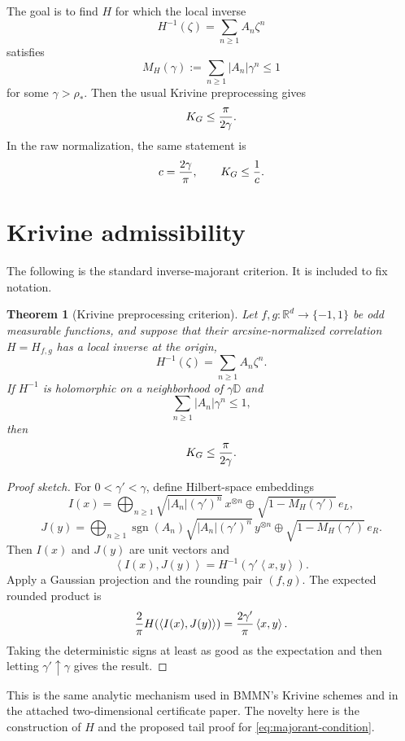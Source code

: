\documentclass[11pt]{article}
\newtheorem{theorem}{Theorem}[section]
\newcommand{\R}{\mathbb{R}}
\newcommand{\D}{\mathbb{D}}
\newcommand{\1}{\mathbf{1}}
\newcommand{\abs}[1]{\left\lvert #1\right\rvert}
\newcommand{\ip}[2]{\left\langle #1,#2\right\rangle}
\begin{document}
The goal is to find \(H\) for which the local inverse
\[
        H^{-1}(\zeta)=\sum_{n\ge1}A_n\zeta^n
\]
satisfies
\begin{equation}\label{eq:majorant-condition}
        M_H(\gamma):=\sum_{n\ge1}\abs{A_n}\gamma^n\le 1
\end{equation}
for some \(\gamma>\rho_*\).  Then the usual Krivine preprocessing gives
\[
        K_G\le {\pi\over 2\gamma}.
\]
In the raw normalization, the same statement is
\[
        c={2\gamma\over\pi},\qquad K_G\le {1\over c}.
\]

\section{Krivine admissibility}

The following is the standard inverse-majorant criterion.  It is included to fix notation.

\begin{theorem}[Krivine preprocessing criterion]\label{thm:krivine}
Let \(f,g:\R^d\to\{-1,1\}\) be odd measurable functions, and suppose that their arcsine-normalized correlation \(H=H_{f,g}\) has a local inverse at the origin,
\[
        H^{-1}(\zeta)=\sum_{n\ge1}A_n\zeta^n.
\]
If \(H^{-1}\) is holomorphic on a neighborhood of \(\gamma\D\) and
\[
        \sum_{n\ge1}\abs{A_n}\gamma^n\le 1,
\]
then
\[
        K_G\le {\pi\over 2\gamma}.
\]
\end{theorem}

\begin{proof}[Proof sketch]
For \(0<\gamma'<\gamma\), define Hilbert-space embeddings
\[
 I(x)=\bigoplus_{n\ge1}\sqrt{\abs{A_n}(\gamma')^n}\,x^{\otimes n}\oplus
       \sqrt{1-M_H(\gamma')}\,e_L,
\]
\[
 J(y)=\bigoplus_{n\ge1}\operatorname{sgn}(A_n)
       \sqrt{\abs{A_n}(\gamma')^n}\,y^{\otimes n}\oplus
       \sqrt{1-M_H(\gamma')}\,e_R.
\]
Then \(I(x)\) and \(J(y)\) are unit vectors and
\[
        \ip{I(x)}{J(y)}=H^{-1}(\gamma'\ip{x}{y}).
\]
Apply a Gaussian projection and the rounding pair \((f,g)\).  The expected rounded product is
\[
        {2\over\pi}H(\ip{I(x)}{J(y)})={2\gamma'\over\pi}\ip{x}{y}.
\]
Taking the deterministic signs at least as good as the expectation and then letting \(\gamma'\uparrow\gamma\) gives the result.
\end{proof}

This is the same analytic mechanism used in BMMN's Krivine schemes and in the attached two-dimensional certificate paper.  The novelty here is the construction of \(H\) and the proposed tail proof for \eqref{eq:majorant-condition}.
\end{document}
